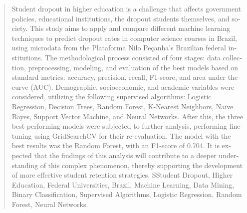 \documentclass[english, spanish, brazilian]{RBIEarticle} %
\begin{document}
\newpage
\begin{otherlanguage}{english}
\begin{abstract}
Student dropout in higher education is a challenge that affects government policies, educational institutions, the dropout students themselves, and society. This study aims to apply and compare different machine learning techniques to predict dropout rates in computer science courses in Brazil, using microdata from the Plataforma Nilo Peçanha's Brazilian federal institutions. The methodological process consisted of four stages: data collection, preprocessing, modeling, and evaluation of the best models based on standard metrics: accuracy, precision, recall, F1-score, and area under the curve (AUC). Demographic, socioeconomic, and academic variables were considered, utilizing the following supervised algorithms: Logistic Regression, Decision Trees, Random Forest, K-Nearest Neighbors, Naïve Bayes, Support Vector Machine, and Neural Networks. After this, the three best-performing models were subjected to further analysis, performing fine-tuning using GridSearchCV for their re-evaluation. The model with the best results was the Random Forest, with an F1-score of 0.704. It is expected that the findings of this analysis will contribute to a deeper understanding of this complex phenomenon, thereby supporting the development of more effective student retention strategies.
\keywords SStudent Dropout, Higher Education, Federal Universities, Brazil, Machine Learning, Data Mining, Binary Classification, Supervised Algorithms, Logistic Regression, Random Forest, Neural Networks.
\end{abstract}
\end{otherlanguage}
\end{document}
